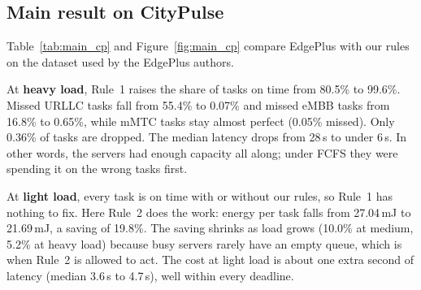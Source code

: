 \documentclass[11pt]{article}
\theoremstyle{definition}
\begin{document}
\subsection{Main result on CityPulse}
Table~\ref{tab:main_cp} and Figure~\ref{fig:main_cp} compare EdgePlus with our rules on the dataset used by the
EdgePlus authors.

At \textbf{heavy load}, Rule~1 raises the share of tasks on time from 80.5\% to 99.6\%. Missed URLLC tasks fall
from 55.4\% to 0.07\% and missed eMBB tasks from 16.8\% to 0.65\%, while mMTC tasks stay almost perfect (0.05\%
missed). Only 0.36\% of tasks are dropped. The median latency drops from 28\,s to under 6\,s. In other words, the
servers had enough capacity all along; under FCFS they were spending it on the wrong tasks first.

At \textbf{light load}, every task is on time with or without our rules, so Rule~1 has nothing to fix. Here
Rule~2 does the work: energy per task falls from 27.04\,mJ to 21.69\,mJ, a saving of 19.8\%. The saving shrinks as
load grows (10.0\% at medium, 5.2\% at heavy load) because busy servers rarely have an empty queue, which is when
Rule~2 is allowed to act. The cost at light load is about one extra second of latency (median 3.6\,s to 4.7\,s),
well within every deadline.
\end{document}
